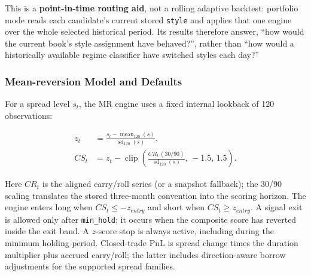 This is a \textbf{point-in-time routing aid}, not a rolling adaptive backtest: portfolio
mode reads each candidate's current stored \texttt{style} and applies that one engine over
the whole selected historical period. Its results therefore answer, ``how would the
current book's style assignment have behaved?'', rather than ``how would a
historically available regime classifier have switched styles each day?''

\subsubsection{Mean-reversion Model and Defaults}

For a spread level $s_t$, the MR engine uses a fixed internal lookback of 120
observations:

\begin{equation}
\begin{aligned}
z_t &= \frac{s_t - \operatorname{mean}_{120}(s)}{\operatorname{sd}_{120}(s)}, \\
CS_t &= z_t - \operatorname{clip}\!\left(\frac{CR_t\,(30/90)}{\operatorname{sd}_{120}(s)},\,-1.5,\,1.5\right).
\end{aligned}
\end{equation}

Here $CR_t$ is the aligned carry/roll series (or a snapshot fallback); the 30/90
scaling translates the stored three-month convention into the scoring horizon. The
engine enters long when $CS_t \le -z_{entry}$ and short when
$CS_t \ge z_{entry}$. A signal exit is allowed only after \texttt{min\_hold}; it occurs
when the composite score has reverted inside the exit band. A $z$-score stop is
always active, including during the minimum holding period. Closed-trade PnL is
spread change times the duration multiplier plus accrued carry/roll; the latter
includes direction-aware borrow adjustments for the supported spread families.

